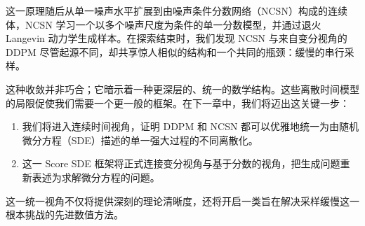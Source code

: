 这一原理随后从单一噪声水平扩展到由噪声条件分数网络（NCSN）构成的连续体，NCSN 学习一个以多个噪声尺度为条件的单一分数模型，并通过退火 Langevin 动力学生成样本。在探索结束时，我们发现 NCSN 与来自变分视角的 DDPM 尽管起源不同，却共享惊人相似的结构和一个共同的瓶颈：缓慢的串行采样。



这种收敛并非巧合；它暗示着一种更深层的、统一的数学结构。这些离散时间模型的局限促使我们需要一个更一般的框架。在下一章中，我们将迈出这关键一步：
\begin{enumerate}
    \item 我们将进入连续时间视角，证明 DDPM 和 NCSN 都可以优雅地统一为由随机微分方程（SDE）描述的单一强大过程的不同离散化。
    \item 这一 Score SDE 框架将正式连接变分视角与基于分数的视角，把生成问题重新表述为求解微分方程的问题。
\end{enumerate}

这一统一视角不仅将提供深刻的理论清晰度，还将开启一类旨在解决采样缓慢这一根本挑战的先进数值方法。